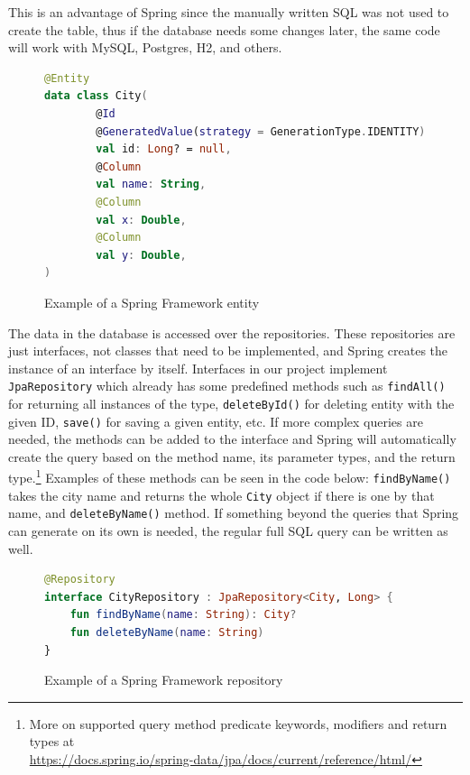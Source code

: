 This is an advantage of Spring since the manually written SQL was not used to create the table, thus if the database needs some changes later,
the same code will work with MySQL, Postgres, H2, and others.

\begin{figure}[hbt!]
    \begin{center}
        \begin{lstlisting}[language=Kotlin,label={lst:spring-code-2},belowskip=-1 \baselineskip]
@Entity
data class City(
        @Id
        @GeneratedValue(strategy = GenerationType.IDENTITY)
        val id: Long? = null,
        @Column
        val name: String,
        @Column
        val x: Double,
        @Column
        val y: Double,
)
        \end{lstlisting}
    \end{center}
    \caption{Example of a Spring Framework entity}
    \label{fig:figure4.8}
\end{figure}

The data in the database is accessed over the repositories. These repositories are just interfaces, not classes that need to be implemented, and
Spring creates the instance of an interface by itself. Interfaces in our project implement \texttt{JpaRepository} which already has some predefined
methods such as \texttt{findAll()} for returning all instances of the type, \texttt{deleteById()} for deleting entity with the given ID,
\texttt{save()} for saving a given entity, etc. If more complex queries are needed, the methods can be added to the interface and Spring will
automatically create the query based on the method name, its parameter types, and the return type.\footnote{More on supported query method
predicate keywords, modifiers and return types at \\ \url{https://docs.spring.io/spring-data/jpa/docs/current/reference/html/}} Examples of these
methods can be seen in the code below: \texttt{findByName()} takes the city name and returns the whole \texttt{City} object if
there is one by that name, and \texttt{deleteByName()} method. If something beyond the queries that Spring can generate on its own is needed, the
regular full SQL query can be written as well.

\begin{figure}[hbt!]
    \begin{center}
        \begin{lstlisting}[language=Kotlin,label={lst:spring-code-3},belowskip=-1 \baselineskip]
@Repository
interface CityRepository : JpaRepository<City, Long> {
    fun findByName(name: String): City?
    fun deleteByName(name: String)
}
        \end{lstlisting}
    \end{center}
    \caption{Example of a Spring Framework repository}
    \label{fig:figure4.9}
\end{figure}

